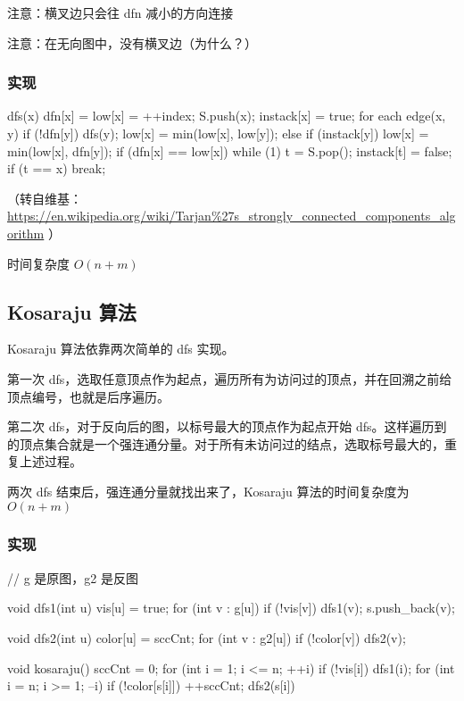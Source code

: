 注意：横叉边只会往 dfn 减小的方向连接

注意：在无向图中，没有横叉边（为什么？）

\subsubsection{实现}

\begin{cppcode}
dfs(x) {
  dfn[x] = low[x] = ++index;
  S.push(x);
  instack[x] = true;
    for
      each edge(x, y) {
        if (!dfn[y]) {
          dfs(y);
          low[x] = min(low[x], low[y]);
        } else if (instack[y]) {
          low[x] = min(low[x], dfn[y]);
        }
      }
    if (dfn[x] == low[x]) {
      while (1) {
        t = S.pop();
        instack[t] = false;
        if (t == x) break;
      }
    }
}
\end{cppcode}

（转自维基：\url{https://en.wikipedia.org/wiki/Tarjan\%27s_strongly_connected_components_algorithm} ）

时间复杂度 $O(n + m)$

\subsection{Kosaraju 算法}

Kosaraju 算法依靠两次简单的 dfs 实现。

第一次 dfs，选取任意顶点作为起点，遍历所有为访问过的顶点，并在回溯之前给顶点编号，也就是后序遍历。

第二次 dfs，对于反向后的图，以标号最大的顶点作为起点开始 dfs。这样遍历到的顶点集合就是一个强连通分量。对于所有未访问过的结点，选取标号最大的，重复上述过程。

两次 dfs 结束后，强连通分量就找出来了，Kosaraju 算法的时间复杂度为 $O(n+m)$

\subsubsection{实现}

\begin{cppcode}
// g 是原图，g2 是反图

void dfs1(int u) {
  vis[u] = true;
  for (int v : g[u])
    if (!vis[v]) dfs1(v);
  s.push_back(v);
}

void dfs2(int u) {
  color[u] = sccCnt;
  for (int v : g2[u])
    if (!color[v]) dfs2(v);
}

void kosaraju() {
  sccCnt = 0;
  for (int i = 1; i <= n; ++i)
    if (!vis[i]) dfs1(i);
  for (int i = n; i >= 1; --i)
    if (!color[s[i]]) {
      ++sccCnt;
      dfs2(s[i])
    }
}
\end{cppcode}

